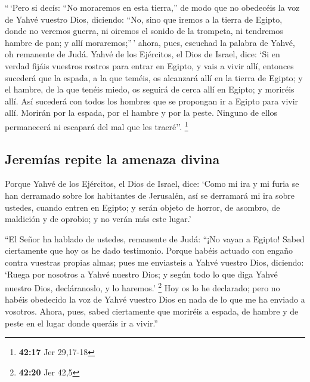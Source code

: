 \begin{paracol}{2}
 ``\,`Pero si decís: ``No moraremos en esta tierra,'' de
modo que no obedecéis la voz de Yahvé vuestro Dios, 
diciendo: ``No, sino que iremos a la tierra de Egipto, donde no veremos
guerra, ni oiremos el sonido de la trompeta, ni tendremos hambre de pan;
y allí moraremos;''\,'  ahora, pues, escuchad la palabra
de Yahvé, oh remanente de Judá. Yahvé de los Ejércitos, el Dios de
Israel, dice: `Si en verdad fijáis vuestros rostros para entrar en
Egipto, y vais a vivir allí,  entonces sucederá que la
espada, a la que teméis, os alcanzará allí en la tierra de Egipto; y el
hambre, de la que tenéis miedo, os seguirá de cerca allí en Egipto; y
moriréis allí.  Así sucederá con todos los hombres que se
propongan ir a Egipto para vivir allí. Morirán por la espada, por el
hambre y por la peste. Ninguno de ellos permanecerá ni escapará del mal
que les traeré''. \footnote{\textbf{42:17} Jer 29,17-18}

\hypertarget{jeremuxedas-repite-la-amenaza-divina}{%
\subsection{Jeremías repite la amenaza
divina}\label{jeremuxedas-repite-la-amenaza-divina}}

 Porque Yahvé de los Ejércitos, el Dios de Israel, dice:
`Como mi ira y mi furia se han derramado sobre los habitantes de
Jerusalén, así se derramará mi ira sobre ustedes, cuando entren en
Egipto; y serán objeto de horror, de asombro, de maldición y de oprobio;
y no verán más este lugar.'

 ``El Señor ha hablado de ustedes, remanente de Judá:
``¡No vayan a Egipto! Sabed ciertamente que hoy os he dado testimonio.
 Porque habéis actuado con engaño contra vuestras propias
almas; pues me enviasteis a Yahvé vuestro Dios, diciendo: `Ruega por
nosotros a Yahvé nuestro Dios; y según todo lo que diga Yahvé nuestro
Dios, decláranoslo, y lo haremos.' \footnote{\textbf{42:20} Jer 42,5}
 Hoy os lo he declarado; pero no habéis obedecido la voz
de Yahvé vuestro Dios en nada de lo que me ha enviado a vosotros.
 Ahora, pues, sabed ciertamente que moriréis a espada, de
hambre y de peste en el lugar donde queráis ir a vivir.''

\switchcolumn
\begin{otherlanguage}{english}

\hypertarget{jeremiah-asked-god-on-behalf-of-his-fellow-citizens-about-emigration}{%
}
\end{otherlanguage}
\end{paracol}
